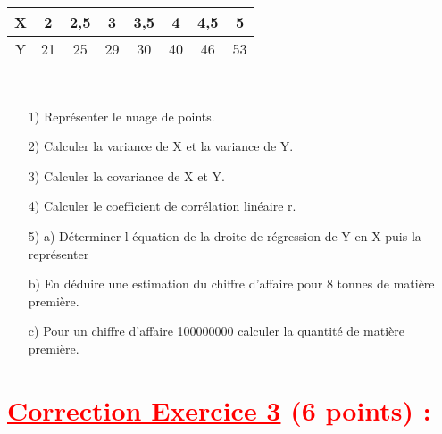 \documentclass[12pt]{article}
\begin{document}
\begin{tabular}{|c|c|c|c|c|c|c|c|}
\hline
X & 2 & 2,5 & 3 & 3,5 & 4 & 4,5 & 5 \\
\hline
Y & 21 & 25 & 29 & 30 & 40 & 46 & 53\\
\hline
\end{tabular}\\
\begin{itemize}
\item[1)] Représenter le nuage de points.\\
\item[2)] Calculer la variance de X et la variance de Y.\\
\item[3)]  Calculer la covariance de X et Y.\\
\item[4)] Calculer le coefficient de corrélation linéaire r.\\
\item[5)] a)  Déterminer l équation de la droite de régression de Y en X puis la représenter\\
\item[b)]  En déduire une estimation du chiffre d’affaire pour 8 tonnes de matière première.\\
\item[c)]  Pour un chiffre d’affaire 100000000 calculer la quantité de matière première.
\end{itemize}
\section*{\textcolor{red}{\underline{Correction Exercice 3} (6 points) :}}
\end{document}
